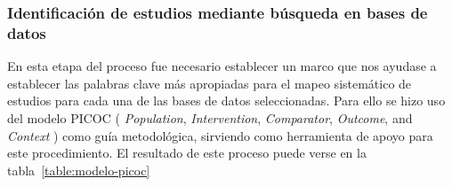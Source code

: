 \newpage
\subsubsection{Identificación de estudios mediante búsqueda en bases de datos}\label{subsubsec:identificacionEstudios}
En esta etapa del proceso fue necesario establecer un marco que nos ayudase a establecer las palabras clave más apropiadas para el mapeo sistemático de estudios para cada una de las bases de datos seleccionadas. Para ello se hizo uso del modelo PICOC ( \textit{Population}, \textit{Intervention}, \textit{Comparator}, \textit{Outcome}, and \textit{Context} ) como guía metodológica, sirviendo como herramienta de apoyo para este procedimiento. El resultado de este proceso puede verse en la tabla~\ref{table:modelo-picoc}

